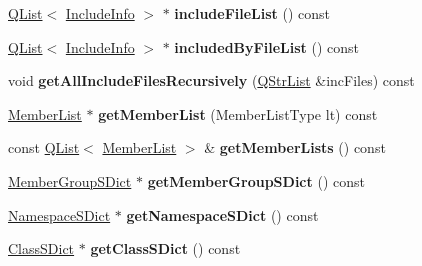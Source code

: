 \begin{DoxyCompactItemize}
\item 
\hypertarget{class_file_def_aa607da3efeb98e50303f3941de1204d2}{\hyperlink{class_q_list}{Q\-List}$<$ \hyperlink{struct_include_info}{Include\-Info} $>$ $\ast$ {\bfseries include\-File\-List} () const }\label{class_file_def_aa607da3efeb98e50303f3941de1204d2}

\item 
\hypertarget{class_file_def_a07e6403ece8a3f4495831f098c669651}{\hyperlink{class_q_list}{Q\-List}$<$ \hyperlink{struct_include_info}{Include\-Info} $>$ $\ast$ {\bfseries included\-By\-File\-List} () const }\label{class_file_def_a07e6403ece8a3f4495831f098c669651}

\item 
\hypertarget{class_file_def_a79bede0bc994c3969f2e8006d19e4c1e}{void {\bfseries get\-All\-Include\-Files\-Recursively} (\hyperlink{class_q_str_list}{Q\-Str\-List} \&inc\-Files) const }\label{class_file_def_a79bede0bc994c3969f2e8006d19e4c1e}

\item 
\hypertarget{class_file_def_ad83336a442ba60d58c394f209406d8c2}{\hyperlink{class_member_list}{Member\-List} $\ast$ {\bfseries get\-Member\-List} (Member\-List\-Type lt) const }\label{class_file_def_ad83336a442ba60d58c394f209406d8c2}

\item 
\hypertarget{class_file_def_a07df9da2a270da9811acecc6f1b3f302}{const \hyperlink{class_q_list}{Q\-List}$<$ \hyperlink{class_member_list}{Member\-List} $>$ \& {\bfseries get\-Member\-Lists} () const }\label{class_file_def_a07df9da2a270da9811acecc6f1b3f302}

\item 
\hypertarget{class_file_def_a614eab46ad0165205bfc3367124bce0a}{\hyperlink{class_member_group_s_dict}{Member\-Group\-S\-Dict} $\ast$ {\bfseries get\-Member\-Group\-S\-Dict} () const }\label{class_file_def_a614eab46ad0165205bfc3367124bce0a}

\item 
\hypertarget{class_file_def_ad03a0f967ecf828380d717ce5d4f4d30}{\hyperlink{class_namespace_s_dict}{Namespace\-S\-Dict} $\ast$ {\bfseries get\-Namespace\-S\-Dict} () const }\label{class_file_def_ad03a0f967ecf828380d717ce5d4f4d30}

\item 
\hypertarget{class_file_def_a9f94a6deac6af811489656badd13fa82}{\hyperlink{class_class_s_dict}{Class\-S\-Dict} $\ast$ {\bfseries get\-Class\-S\-Dict} () const }\label{class_file_def_a9f94a6deac6af811489656badd13fa82}


\end{DoxyCompactItemize}

